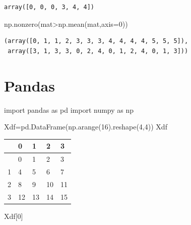 \documentclass[
  a4paper,
  DIV=11,
  numbers=noendperiod]{scrreprt}
\newenvironment{Shaded}{\begin{snugshade}}{\end{snugshade}}
\newcommand{\DecValTok}[1]{\textcolor[rgb]{0.68,0.00,0.00}{#1}}
\newcommand{\ImportTok}[1]{\textcolor[rgb]{0.00,0.46,0.62}{#1}}
\newcommand{\NormalTok}[1]{\textcolor[rgb]{0.00,0.23,0.31}{#1}}
\newcommand{\OperatorTok}[1]{\textcolor[rgb]{0.37,0.37,0.37}{#1}}
\begin{document}
\begin{verbatim}
array([0, 0, 0, 3, 4, 4])
\end{verbatim}

\begin{Shaded}
\begin{Highlighting}[]
\NormalTok{np.nonzero(mat}\OperatorTok{\textgreater{}}\NormalTok{np.mean(mat,axis}\OperatorTok{=}\DecValTok{0}\NormalTok{))}
\end{Highlighting}
\end{Shaded}

\begin{verbatim}
(array([0, 1, 1, 2, 3, 3, 3, 4, 4, 4, 4, 5, 5, 5]),
 array([3, 1, 3, 3, 0, 2, 4, 0, 1, 2, 4, 0, 1, 3]))
\end{verbatim}

\chapter{Pandas}\label{pandas}

\begin{Shaded}
\begin{Highlighting}[]
\ImportTok{import}\NormalTok{ pandas }\ImportTok{as}\NormalTok{ pd}
\ImportTok{import}\NormalTok{ numpy }\ImportTok{as}\NormalTok{ np}
\end{Highlighting}
\end{Shaded}

\begin{Shaded}
\begin{Highlighting}[]
\NormalTok{Xdf}\OperatorTok{=}\NormalTok{pd.DataFrame(np.arange(}\DecValTok{16}\NormalTok{).reshape(}\DecValTok{4}\NormalTok{,}\DecValTok{4}\NormalTok{))}
\NormalTok{Xdf}
\end{Highlighting}
\end{Shaded}

\begin{longtable}[]{@{}lllll@{}}
\toprule\noalign{}
& 0 & 1 & 2 & 3 \\
\midrule\noalign{}
\endhead
\bottomrule\noalign{}
\endlastfoot
0 & 0 & 1 & 2 & 3 \\
1 & 4 & 5 & 6 & 7 \\
2 & 8 & 9 & 10 & 11 \\
3 & 12 & 13 & 14 & 15 \\
\end{longtable}

\begin{Shaded}
\begin{Highlighting}[]
\NormalTok{Xdf[}\DecValTok{0}\NormalTok{]}
\end{Highlighting}
\end{Shaded}
\end{document}
